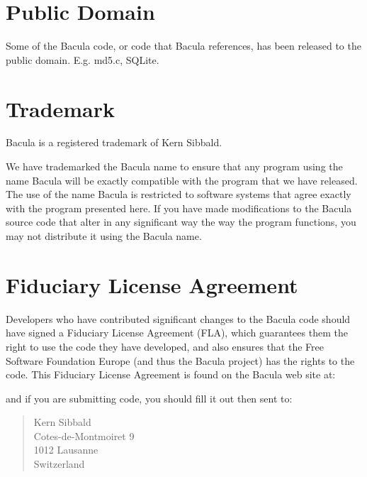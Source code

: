 \section{Public Domain}

Some of the Bacula code, or code that Bacula references, has been released
to the public domain.  E.g.  md5.c, SQLite.

\section{Trademark}

Bacula\raisebox{.6ex}{\textsuperscript{\textregistered}} is a registered
trademark of Kern Sibbald.

We have trademarked the Bacula name to ensure that any program using the
name Bacula will be exactly compatible with the program that we have
released.  The use of the name Bacula is restricted to software systems
that agree exactly with the program presented here. If you have made
modifications to the Bacula source code that alter in any significant
way the way the program functions, you may not distribute it using the
Bacula name.

\section{Fiduciary License Agreement}
Developers who have contributed significant changes to the Bacula code
should have signed a Fiduciary License Agreement (FLA), which 
guarantees them the right to use the code they have developed, and also
ensures that the Free Software Foundation Europe (and thus the Bacula
project) has the rights to the code.  This Fiduciary License Agreement
is found on the Bacula web site at:


and if you are submitting code, you should fill it out then sent to:

\begin{quote}
     Kern Sibbald \\
     Cotes-de-Montmoiret 9 \\
     1012 Lausanne \\
     Switzerland \\
\end{quote}

